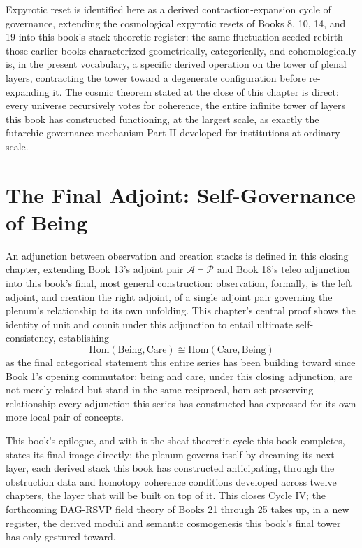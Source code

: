 Expyrotic reset is identified here as a derived contraction-expansion cycle of governance, extending the cosmological expyrotic resets of Books 8, 10, 14, and 19 into this book's stack-theoretic register: the same fluctuation-seeded rebirth those earlier books characterized geometrically, categorically, and cohomologically is, in the present vocabulary, a specific derived operation on the tower of plenal layers, contracting the tower toward a degenerate configuration before re-expanding it. The cosmic theorem stated at the close of this chapter is direct: every universe recursively votes for coherence, the entire infinite tower of layers this book has constructed functioning, at the largest scale, as exactly the futarchic governance mechanism Part II developed for institutions at ordinary scale.

\chapter{The Final Adjoint: Self-Governance of Being}

An adjunction between observation and creation stacks is defined in this closing chapter, extending Book 13's adjoint pair $\mathcal{A} \dashv \mathcal{P}$ and Book 18's teleo adjunction into this book's final, most general construction: observation, formally, is the left adjoint, and creation the right adjoint, of a single adjoint pair governing the plenum's relationship to its own unfolding. This chapter's central proof shows the identity of unit and counit under this adjunction to entail ultimate self-consistency, establishing
\[
\mathrm{Hom}(\text{Being}, \text{Care}) \cong \mathrm{Hom}(\text{Care}, \text{Being})
\]
as the final categorical statement this entire series has been building toward since Book 1's opening commutator: being and care, under this closing adjunction, are not merely related but stand in the same reciprocal, hom-set-preserving relationship every adjunction this series has constructed has expressed for its own more local pair of concepts.

This book's epilogue, and with it the sheaf-theoretic cycle this book completes, states its final image directly: the plenum governs itself by dreaming its next layer, each derived stack this book has constructed anticipating, through the obstruction data and homotopy coherence conditions developed across twelve chapters, the layer that will be built on top of it. This closes Cycle IV; the forthcoming DAG-RSVP field theory of Books 21 through 25 takes up, in a new register, the derived moduli and semantic cosmogenesis this book's final tower has only gestured toward.

